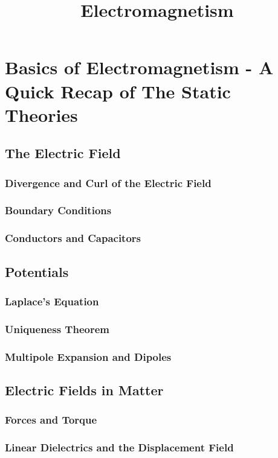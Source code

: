 \documentclass[a4paper]{article}
\title{Electromagnetism}
\begin{document}
    \maketitle
    \tableofcontents
    \newpage

    \section{Basics of Electromagnetism - A Quick Recap of The Static Theories}
    \subsection{The Electric Field}
    \subsubsection{Divergence and Curl of the Electric Field}
    \subsubsection{Boundary Conditions}
    \subsubsection{Conductors and Capacitors}
    \subsection{Potentials}
    \subsubsection{Laplace's Equation}
    \subsubsection{Uniqueness Theorem}
    \subsubsection{Multipole Expansion and Dipoles}
    \subsection{Electric Fields in Matter}
    \subsubsection{Forces and Torque}
    \subsubsection{Linear Dielectrics and the Displacement Field}
\end{document}
